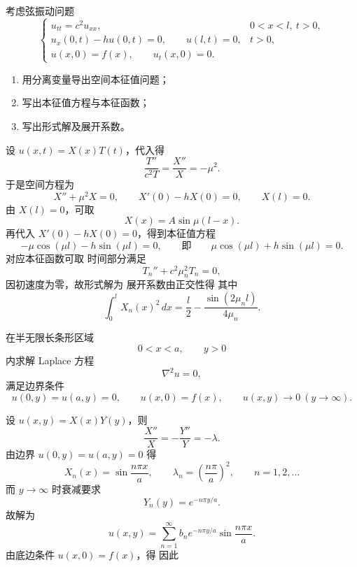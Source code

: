 ﻿


\begin{question}
考虑弦振动问题
\[
\begin{cases}
 u_{tt}=c^2u_{xx}, & 0<x<l,\ t>0,\\
 u_x(0,t)-h u(0,t)=0,\qquad u(l,t)=0, & t>0,\\
 u(x,0)=f(x),\qquad u_t(x,0)=0.
\end{cases}
\]
\begin{enumerate}[label=（\arabic*）,leftmargin=2.8em,itemsep=0.2em]
\item 用分离变量导出空间本征值问题；
\item 写出本征值方程与本征函数；
\item 写出形式解及展开系数。
\end{enumerate}
\begin{solution}

设 $u(x,t)=X(x)T(t)$，代入得
\[
\frac{T''}{c^2T}=\frac{X''}{X}=-\mu^2.
\]
于是空间方程为
\[
X''+\mu^2X=0,
\qquad X'(0)-hX(0)=0,
\qquad X(l)=0.
\]
由 $X(l)=0$，可取
\[
X(x)=A\sin\mu(l-x).
\]
再代入 $X'(0)-hX(0)=0$，得到本征值方程
\[
-\mu\cos(\mu l)-h\sin(\mu l)=0,
\qquad\text{即}\qquad
\boxed{\mu\cos(\mu l)+h\sin(\mu l)=0.}
\]
对应本征函数可取
时间部分满足
\[
T_n''+c^2\mu_n^2T_n=0,
\]
因初速度为零，故形式解为
展开系数由正交性得
其中
\[
\int_0^l X_n(x)^2\,dx
=\frac l2-\frac{\sin(2\mu_n l)}{4\mu_n}.
\]
\end{solution}
\end{question}

\begin{question}
在半无限长条形区域
\[
0<x<a,\qquad y>0
\]
内求解 Laplace 方程
\[
\nabla^2u=0,
\]
满足边界条件
\[
u(0,y)=u(a,y)=0,\qquad u(x,0)=f(x),\qquad u(x,y)\to0\ (y\to\infty).
\]
\begin{solution}

设 $u(x,y)=X(x)Y(y)$，则
\[
\frac{X''}{X}=-\frac{Y''}{Y}=-\lambda.
\]
由边界 $u(0,y)=u(a,y)=0$ 得
\[
X_n(x)=\sin\frac{n\pi x}{a},
\qquad \lambda_n=\left(\frac{n\pi}{a}\right)^2,
\qquad n=1,2,\dots
\]
而 $y\to\infty$ 时衰减要求
\[
Y_n(y)=e^{-n\pi y/a}.
\]
故解为
\[
u(x,y)=\sum_{n=1}^{\infty}b_n e^{-n\pi y/a}\sin\frac{n\pi x}{a}.
\]
由底边条件 $u(x,0)=f(x)$，得
因此
\end{solution}
\end{question}

